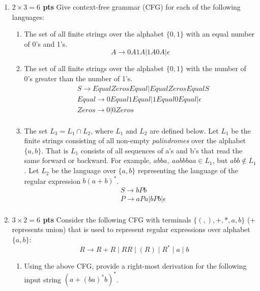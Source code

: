 \documentclass[10pt]{article}
\newcommand {\pts}[1]{{\bf #1 pts}}
\begin{document}
\begin{enumerate}
  \item  \pts{$2\times 3= 6$} Give context-free grammar (CFG) for each of the following languages:
  \begin{enumerate}
           \item The set of all finite strings over the alphabet $\{0,1\}$ with an equal number of 0's and 1's.
            \[
            A \rightarrow 0A1A | 1A0A | \epsilon
            \]
           \item The set of all finite strings over the alphabet $\{0,1\}$ with the number of 0's greater than the number of 1's.
            \begin{equation*}\begin{aligned}
            & S \rightarrow Equal Zeros Equal | Equal Zeros Equal S \\
            & Equal \rightarrow 0Equal1Equal | 1Equal0Equal | \epsilon \\
            & Zeros \rightarrow 0 | 0Zeros \\
            \end{aligned}\end{equation*}
           \item The set $L_3=L_1\cap L_2$, where $L_1$ and $L_2$ are defined below.
           Let $L_1$ be the finite strings consisting of all non-empty \emph{palindromes} over the alphabet $\{a,b\}$. That is $L_1$
           consists of all sequences of a's and b's that read the same forward or backward. For example, $abba,~aabbbaa\in L_1$, but $abb\not\in L_1$.
           Let $L_2$ be the language over  $\{a,b\}$ representing the language of the regular expression $b(a+b)^\ast$.
            \begin{equation*}\begin{aligned}
            & S \rightarrow bPb \\
            & P \rightarrow aPa | bPb | \epsilon \\
            \end{aligned}\end{equation*}
  \end{enumerate}
  \item \pts{$3\times 2= 6$} Consider the following CFG with terminals $\{(,),+,*,a,b\}$ ($+$ represents union) that is used to represent
regular expressions over alphabet $\{a, b\}$:
\[R\rightarrow R+R \mid RR\mid (R)\mid R^\ast \mid a\mid b\]
\begin{enumerate}
  \item Using the above CFG, provide a right-most derivation for the following input string $(a+(ba)^\ast b)^\ast$.

\end{enumerate}
\end{enumerate}
\end{document}
